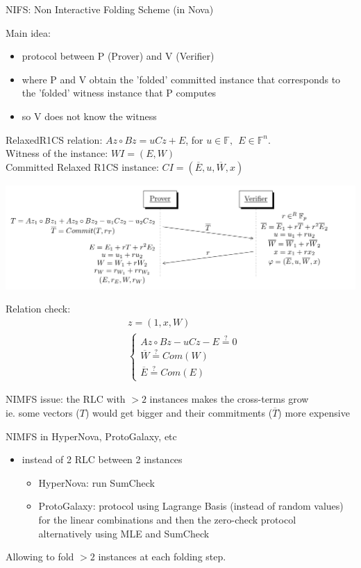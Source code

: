 \documentclass[t]{beamer} \usefonttheme[onlymath]{serif}
\begin{document}
\begin{frame}{NIFS: Non Interactive Folding Scheme (in Nova)}
  {\tiny
  Main idea:
  \begin{itemize}
    \item protocol between P (Prover) and V (Verifier)
    \item where P and V obtain the 'folded' committed instance that corresponds to the 'folded' witness instance that P computes
    \item so V does not know the witness
  \end{itemize}
  RelaxedR1CS relation: $Az \circ Bz = uCz + E$, for $u \in \mathbb{F},~~ E \in \mathbb{F}^n$.
  \\Witness of the instance: $WI=(E, W)$\\
  Committed Relaxed R1CS instance: $CI = (\overline{E}, u, \overline{W}, x)$

  \includegraphics[width=\textwidth]{interactive-FS-nova-diagram}

  Relation check:
  \begin{align*}
    &z=(1,x,W)\\
     &\begin{cases}
    Az \circ Bz - uCz - E \stackrel{?}{=} 0\\
    \overline{W} \stackrel{?}{=} Com(W)\\
    \overline{E} \stackrel{?}{=} Com(E)
  \end{cases}
  \end{align*}
  }
\end{frame}

\begin{frame}{NIMFS}
  issue: the RLC with $>2$ instances makes the cross-terms grow
  \\ie. some vectors ($T$) would get bigger and their commitments ($\overline{T}$) more expensive

  \pause
  \vspace{0.5cm}

  NIMFS in HyperNova, ProtoGalaxy, etc
  \begin{itemize}
    \item instead of 2 RLC between 2 instances
    \begin{itemize}
      \item HyperNova: run SumCheck
      \item ProtoGalaxy: protocol using Lagrange Basis (instead of random values) for the linear combinations and then the zero-check protocol
        \\alternatively using MLE and SumCheck
    \end{itemize}
  \end{itemize}
  Allowing to fold $>2$ instances at each folding step.
\end{frame}
\end{document}
